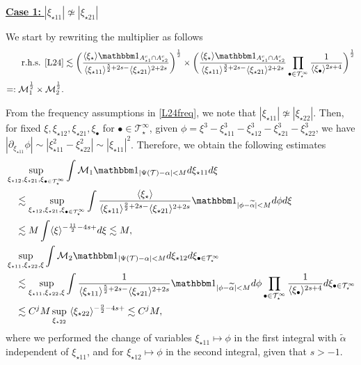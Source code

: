 \documentclass[%
11pt,  reqno]{amsart}
\newcommand{\5}{\textup{V}}
\newcommand{\noi}{\noindent}
\newcommand{\ind}{\mathbbm 1}
\newcommand{\les}{\lesssim}
\newcommand{\wt}{\widetilde}
\theoremstyle{remark}
\newcommand{\bul}{\bullet}
\newcommand{\TT}{\mathcal{T}}
\newcommand{\al}{\alpha}
\newcommand{\jb}[1]
{\langle #1 \rangle}
\newcommand{\M}{\mathcal{M}}
\numberwithin{equation}{section}
\numberwithin{theorem}{section}
\begin{document}
\smallskip
\noi
\underline{\textbf{Case 1:} $|\xi_{\star11}| \not\simeq |\xi_{\star21}|$}

We start by rewriting the multiplier as follows
\begin{align}
\text{r.h.s. \eqref{L24}}
& 
\les  \bigg( \frac{\jb{\xi_\star}
\ind_{ A^c_{\star1} \cap A^c_{\star2}}
}{\jb{\xi_{\star11}}^{\frac52+2s-} \jb{\xi_{\star21}}^{2+2s}}  \bigg)^\frac12 
\times 
\bigg(
\frac{
\jb{\xi_\star}
\ind_{ A^c_{\star1} \cap A^c_{\star2}}
}{
\jb{\xi_{\star11}}^{\frac32+2s-}
\jb{\xi_{\star21}}^{2+2s}
}
\prod_{\bul\in \TT^\infty_\star} \frac{1}{\jb{\xi_\bul}^{2s+4}}
\bigg)^\frac12
\\
=: \M_1^\frac12 \times \M_2^\frac12
.
\end{align}

\noi
From the frequency assumptions in \eqref{L24freq}, we note that $|\xi_{\star11}| \not\simeq |\xi_{\star22}|$. 
Then, for fixed $\xi, \xi_{\star12}, \xi_{\star21}, \xi_\bul$ for $\bul\in \TT^\infty_\star$, given $\phi = \xi^3 - \xi_{\star11}^3 - \xi_{\star12}^3 - \xi_{\star21}^3 - \xi_{\star22}^3$, we have $|\partial_{\xi_{\star11}} \phi | \sim  |\xi_{\star11}^2 - \xi_{\star22}^2| \sim |\xi_{\star11}|^2$. Therefore, we obtain the following estimates
\begin{align}
& 
\sup_{\xi_{\star12}, \xi_{\star21}, \xi_{\bul\in \TT^\infty_\star}}
\int \M_1 \ind_{|\Psi(\TT) - \al| < M } d\xi_{\star11} d\xi 
\\
&
\quad 
\les 
\sup_{\xi_{\star12}, \xi_{\star21}, \xi_{\bul\in \TT^\infty_\star}}
\int 
\frac{\jb{\xi_\star} }{ \jb{\xi_{\star11}}^{\frac92 + 2s-} \jb{\xi_{\star21}}^{2+2s} } \ind_{|\phi - \wt\al| < M } d\phi d\xi 
\\
&
\quad 
\les M \int \jb{\xi}^{-\frac{11}{2} - 4s + } d\xi \les M, 
\\
&
\sup_{\xi_{\star11}, \xi_{\star22}, \xi} 
\int \M_2  \ind_{|\Psi(\TT) - \al| < M} 
d \xi_{\star12} 
d\xi_{\bul \in \TT^\infty_\star}
\\
&
\quad 
\les 
\sup_{\xi_{\star11}, \xi_{\star22}, \xi} 
\int 
\frac{ 1  }{ \jb{\xi_{\star11}}^{\frac52 + 2s -} \jb{\xi_{\star21}}^{2+2s} } \ind_{|\phi - \wt\al| < M} d\phi 
\prod_{\bul\in \TT^\infty_\star} \frac{1}{\jb{\xi_\bul}^{2s+4}}
d\xi_{\bul \in \TT^\infty_\star}
\\
&
\quad 
\les
 C^{j} M  \sup_{\xi_{\star22}}\ \jb{\xi_{\star22}}^{- \frac92 - 4s + } \les C^{j} M 
, 
\end{align}
where we performed the change of variables $\xi_{\star11} \mapsto \phi$ in the first integral with $\wt\al$ independent of $\xi_{\star11}$, 
and for $\xi_{\star12} \mapsto \phi$ in the second integral, 
given that $s>-1$. 
\end{document}
